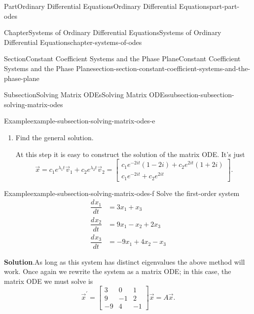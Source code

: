 \documentclass[twoside,10pt,]{book}
\newcommand{\blocktitlefont}{\relax}
\numberwithin{equation}{part}
\newcommand{\dv}[3][]{\dfrac{d^{#1} #2}{d #3^{#1}}}
\begin{document}
\begin{partptx}{Part}{Ordinary Differential Equations}{}{Ordinary Differential Equations}{}{}{part-part-odes}
\begin{chapterptx}{Chapter}{Systems of Ordinary Differential Equations}{}{Systems of Ordinary Differential Equations}{}{}{chapter-systems-of-odes}
\begin{sectionptx}{Section}{Constant Coefficient Systems and the Phase Plane}{}{Constant Coefficient Systems and the Phase Plane}{}{}{section-section-constant-coefficient-systems-and-the-phase-plane}
\begin{subsectionptx}{Subsection}{Solving Matrix ODEs}{}{Solving Matrix ODEs}{}{}{subsection-subsection-solving-matrix-odes}
\begin{example}{Example}{}{example-subsection-solving-matrix-odes-e}
\begin{enumerate}
Setting \(\lambda=-2i\) in the second equation gives \(v_{1} = (1-2i)v_{2}\), so an eigenvector of \(A\) corresponding to \(\lambda_{1} = -2i\) is%
\begin{equation*}
\vec{v} = \begin{bmatrix}1-2i \\ 1\end{bmatrix}.
\end{equation*}
Similarly, an eigenvector corresponding to \(\lambda_{2}=2i\) is%
\begin{equation*}
\vec{v}_{2} = \begin{bmatrix}1+2i\\1\end{bmatrix}.
\end{equation*}
%
\item{}Find the general solution.%
\par
At this step it is easy to construct the solution of the matrix ODE. It's just%
\begin{equation*}
\vec{x} = c_{1}e^{\lambda_{1}t}\vec{v}_{1} + c_{2}e^{\lambda_{2}t}\vec{v}_{2} = \begin{bmatrix}c_{1}e^{-2it}(1-2i)+c_{2}e^{2it}(1+2i) \\ c_{1}e^{-2it}+c_{2}e^{2it}\end{bmatrix}.
\end{equation*}
%
\end{enumerate}
%
\end{example}
\begin{example}{Example}{}{example-subsection-solving-matrix-odes-f}%
Solve the first-order system%
\begin{align*}
\dv{x_{1}}{t} & = 3x_{1}+x_{3}\\
\dv{x_{2}}{t} & = 9x_{1}-x_{2}+2x_{3}\\
\dv{x_{3}}{t} & = -9x_{1} + 4x_{2} - x_{3}
\end{align*}
%
\par\smallskip%
\noindent\textbf{\blocktitlefont Solution}.\hypertarget{solution-subsection-solving-matrix-odes-f-b}{}\quad{}As long as this system has distinct eigenvalues the above method will work. Once again we rewrite the system as a matrix ODE; in this case, the matrix ODE we must solve is%
\begin{equation*}
\vec{x}^\prime = \begin{bmatrix}3 &  0 &  1 \\ 9 &  -1 &  2 \\ -9 &  4 &  -1\end{bmatrix}\vec{x} = A\vec{x}.

\end{equation*}
\end{example}
\end{subsectionptx}
\end{sectionptx}
\end{chapterptx}
\end{partptx}
\end{document}
